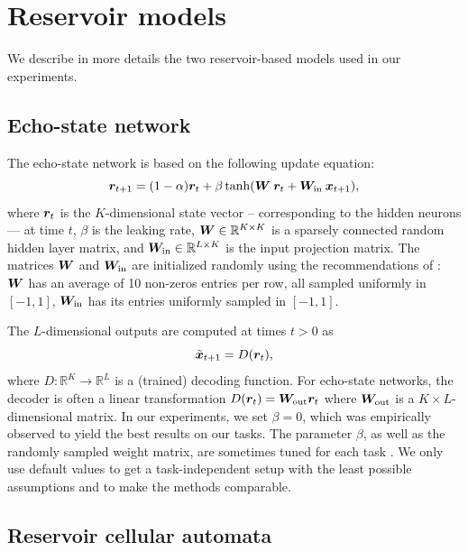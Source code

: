 \section{Reservoir models\label{sec:res-models}}
We describe in more details the two reservoir-based models used in our experiments.
\subsection{Echo-state network}
The echo-state network is based on the
following update equation:
\begin{equation}
  \label{eq:esn}
  {\bm{r}}_{t + 1} = (1 - \alpha) {\bm{r}}_{t} +
  \beta \tanh({\bm{W}}\: {\bm{r}}_{t} + {\bm{W}}_{\text{in}}\: {\bm{x}}_{t + 1}),
\end{equation}
where ${\bm{r}}_{t}$ is the $K$-dimensional state vector -- corresponding to the hidden neurons
--- at time $t$, $\beta$ is the leaking rate, ${\bm{W}} \in \mathbb{R}^{K \times K}$ is a sparsely
connected random hidden layer matrix, and ${\bm{W}}_{\text{in}} \in \mathbb{R}^{L \times K}$ is the
input projection matrix. The matrices ${\bm{W}}$ and ${\bm{W}}_{\text{in}}$ are
initialized randomly using the recommendations of
\cite{jaegerLongShortTermMemory2012}: ${\bm{W}}$ has an average of 10 non-zeros
entries per row, all sampled uniformly in $[-1, 1]$, ${\bm{W}}_{\text{in}}$ has its
entries uniformly sampled in $[-1, 1]$.

The $L$-dimensional outputs are computed at times $t > 0$ as
\begin{equation}
  \label{eq:esn-res}
\tilde{{\bm{x}}}_{t+ 1} = D({\bm{r}}_{t}),
\end{equation}
where $D: \mathbb{R}^{K} \rightarrow \mathbb{R}^{L}$ is a (trained) decoding function. For echo-state networks, the
decoder is often a linear transformation
$D({\bm{r}}_{t}) = {\bm{W}}_{\text{out}} {\bm{r}}_{t}$ where ${\bm{W}}_{\text{out}}$ is a
$K \times L$-dimensional matrix. In our experiments, we set $\beta = 0$, which was
empirically observed to yield the best results on our tasks. The parameter $\beta$,
as well as the randomly sampled weight matrix, are sometimes tuned for each task
\cite{jaegerLongShortTermMemory2012}. We only use
default values to get a task-independent setup with
the least possible assumptions and to make the methods comparable.

\subsection{Reservoir cellular automata\label{sec:app-ca-res}}

